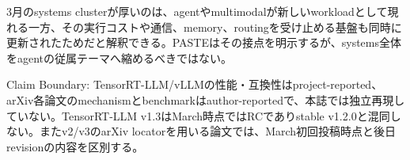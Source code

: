3月のsystems clusterが厚いのは、agentやmultimodalが新しいworkloadとして現れる一方、その実行コストや通信、memory、routingを受け止める基盤も同時に更新されたためだと解釈できる。PASTEはその接点を明示するが、systems全体をagentの従属テーマへ縮めるべきではない。\autocite{src-361b6111931d,src-446e2c561111,src-d6cda62f02bb,src-fc697f165940}


\begin{claimboundary}
Claim Boundary: TensorRT-LLM/vLLMの性能・互換性はproject-reported、arXiv各論文のmechanismとbenchmarkはauthor-reportedで、本誌では独立再現していない。TensorRT-LLM v1.3はMarch時点ではRCでありstable v1.2.0と混同しない。またv2/v3のarXiv locatorを用いる論文では、March初回投稿時点と後日revisionの内容を区別する。\autocite{src-361b6111931d,src-3802d01433c1,src-446e2c561111,src-795aff00bd48,src-7e670bf82538,src-b08e40540c2a,src-b6e517afaa35,src-d6cda62f02bb,src-fc697f165940}
\end{claimboundary}
